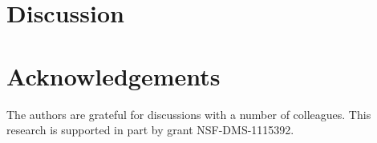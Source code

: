 \documentclass[]{article}
\theoremstyle{definition}
\theoremstyle{remark}
\begin{document}
\section{Discussion} \label{discusssec}

\section{Acknowledgements}  The authors are grateful for discussions with a number of colleagues. This research is supported in part by grant NSF-DMS-1115392.


\end{document}
